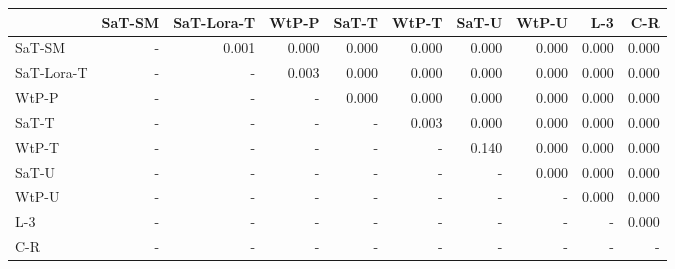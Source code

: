 \begin{tabular}{lrrrrrrrrr}
\toprule
 & SaT-SM & SaT-Lora-T & WtP-P & SaT-T & WtP-T & SaT-U & WtP-U & L-3 & C-R \\
\midrule
SaT-SM & - & 0.001 & 0.000 & 0.000 & 0.000 & 0.000 & 0.000 & 0.000 & 0.000 \\
SaT-Lora-T & - & - & 0.003 & 0.000 & 0.000 & 0.000 & 0.000 & 0.000 & 0.000 \\
WtP-P & - & - & - & 0.000 & 0.000 & 0.000 & 0.000 & 0.000 & 0.000 \\
SaT-T & - & - & - & - & 0.003 & 0.000 & 0.000 & 0.000 & 0.000 \\
WtP-T & - & - & - & - & - & 0.140 & 0.000 & 0.000 & 0.000 \\
SaT-U & - & - & - & - & - & - & 0.000 & 0.000 & 0.000 \\
WtP-U & - & - & - & - & - & - & - & 0.000 & 0.000 \\
L-3 & - & - & - & - & - & - & - & - & 0.000 \\
C-R & - & - & - & - & - & - & - & - & - \\
\bottomrule
\end{tabular}

